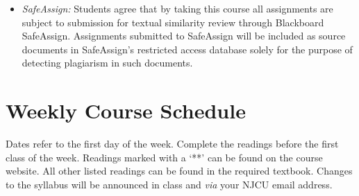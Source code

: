 \documentclass[article,oneside]{memoir}
\begin{document}
\begin{itemize}
\item \textit{SafeAssign:} Students agree that by taking this course all assignments are subject to submission for textual similarity review through Blackboard SafeAssign. Assignments submitted to SafeAssign will be included as source documents in SafeAssign's restricted access database solely for the purpose of detecting plagiarism in such documents.  


\end{itemize}




\section{Weekly Course Schedule}
Dates refer to the first day of the week. Complete the readings before the first class of the week. Readings marked with a `**' can be found on the course website. All other listed readings can be found in the required textbook. Changes to the syllabus will be announced in class and \emph{via} your NJCU email address.
\end{document}
